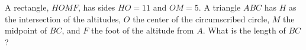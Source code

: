 A rectangle, $HOMF$, has sides $HO=11$ and $OM=5$.  A triangle
$ABC$ has $H$ as the intersection of the altitudes, $O$ the center of
the circumscribed circle, $M$ the midpoint of $BC$, and $F$ the foot of the
altitude from $A$.  What is the length of $BC$?
